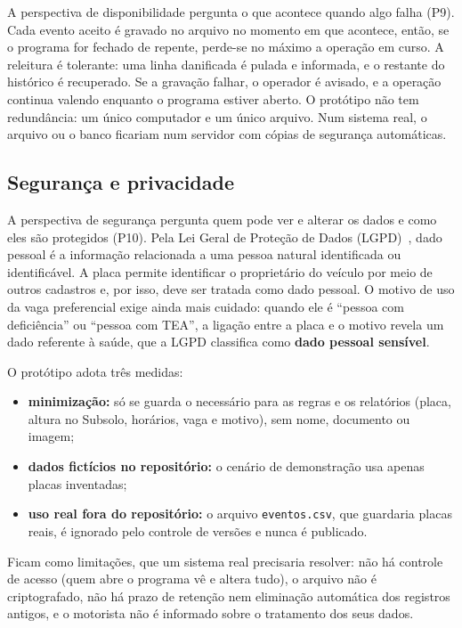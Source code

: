 A perspectiva de disponibilidade pergunta o que acontece quando algo falha (P9). Cada evento aceito é gravado no arquivo no momento em que acontece, então, se o programa for fechado de repente, perde-se no máximo a operação em curso. A releitura é tolerante: uma linha danificada é pulada e informada, e o restante do histórico é recuperado. Se a gravação falhar, o operador é avisado, e a operação continua valendo enquanto o programa estiver aberto. O protótipo não tem redundância: um único computador e um único arquivo. Num sistema real, o arquivo ou o banco ficariam num servidor com cópias de segurança automáticas.

\subsection{Segurança e privacidade}

A perspectiva de segurança pergunta quem pode ver e alterar os dados e como eles são protegidos (P10). Pela Lei Geral de Proteção de Dados (LGPD)~\cite{lei13709}, dado pessoal é a informação relacionada a uma pessoa natural identificada ou identificável. A placa permite identificar o proprietário do veículo por meio de outros cadastros e, por isso, deve ser tratada como dado pessoal. O motivo de uso da vaga preferencial exige ainda mais cuidado: quando ele é ``pessoa com deficiência'' ou ``pessoa com TEA'', a ligação entre a placa e o motivo revela um dado referente à saúde, que a LGPD classifica como \textbf{dado pessoal sensível}.

O protótipo adota três medidas:
\begin{itemize}
  \item \textbf{minimização:} só se guarda o necessário para as regras e os relatórios (placa, altura no Subsolo, horários, vaga e motivo), sem nome, documento ou imagem;
  \item \textbf{dados fictícios no repositório:} o cenário de demonstração usa apenas placas inventadas;
  \item \textbf{uso real fora do repositório:} o arquivo \texttt{eventos.csv}, que guardaria placas reais, é ignorado pelo controle de versões e nunca é publicado.
\end{itemize}

Ficam como limitações, que um sistema real precisaria resolver: não há controle de acesso (quem abre o programa vê e altera tudo), o arquivo não é criptografado, não há prazo de retenção nem eliminação automática dos registros antigos, e o motorista não é informado sobre o tratamento dos seus dados.

